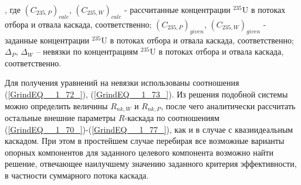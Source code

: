 , где ${(C_{235, P})}_{calc}$, ${(C_{235, W})}_{calc}$ - рассчитанные концентрации $^{235}$U в потоках отбора и отвала каскада, соответственно; ${(C_{235, P})}_{given}$, ${(C_{235, W})}_{given}$ - заданные концентрации $^{235}$U в потоках отбора и отвала каскада, соответственно; $\Delta_{P}$, $\Delta_{W}$ -- невязки по концентрациям $^{235}$U в потоках отбора и отвала каскада, соответственно. 

Для получения уравнений на невязки использованы соотношения (\ref{GrindEQ__1_72_}), (\ref{GrindEQ__1_73_}). Из решения подобной системы можно определить величины $R_{n k,W}$ и $R_{n k,P}$, после чего аналитически рассчитать остальные внешние параметры $R$-каскада по соотношениям (\ref{GrindEQ__1_70_})-(\ref{GrindEQ__1_77_}), как и в случае с квазиидеальным каскадом. При этом в простейшем случае перебирая все возможные варианты опорных компонентов для заданного целевого компонента возможно найти решение, отвечающее наилучшему значению заданного критерия эффективности, в частности суммарного потока каскада.



